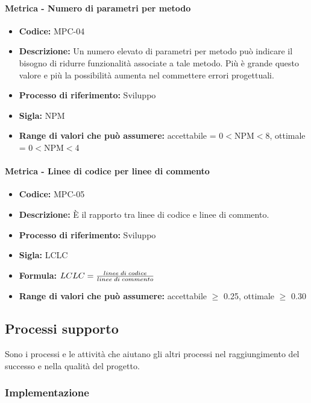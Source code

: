     \paragraph{Metrica - Numero di parametri per metodo} 
    \begin{itemize}
        \item \textbf{Codice:} MPC-04
        \item \textbf{Descrizione:} Un numero elevato di parametri per metodo può indicare il bisogno di ridurre funzionalità associate a tale metodo. Più è grande questo valore e più la possibilità aumenta nel commettere errori progettuali.
        \item \textbf{Processo di riferimento:} Sviluppo
        \item \textbf{Sigla:} NPM
        \item \textbf{Range di valori che può assumere:} accettabile = 0$<$NPM$<$8, ottimale = 0$<$NPM$<$4
    \end{itemize}

    \paragraph{Metrica - Linee di codice per linee di commento}
    \begin{itemize}
        \item \textbf{Codice:} MPC-05
        \item \textbf{Descrizione:} È il rapporto tra linee di codice e linee di commento.
        \item \textbf{Processo di riferimento:} Sviluppo
        \item \textbf{Sigla:} LCLC
        \item \textbf{Formula:} \begin{math}{LCLC = {linee \; di \; codice \over linee \; di \; commento}}\end{math}
        \item \textbf{Range di valori che può assumere:} accettabile $\geq$ 0.25, ottimale $\geq$ 0.30
    \end{itemize}

\subsection{Processi supporto}
Sono i processi e le attività che aiutano gli altri processi nel raggiungimento del successo e nella qualità del progetto.
  
\subsubsection{Implementazione}
